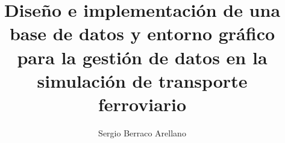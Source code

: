 
\title{Diseño e implementación de una base de datos y entorno gráfico para la gestión
de datos en la simulación de transporte ferroviario}
\author{Sergio Berraco Arellano}










\address{UCLM --- Escuela de Ingeniería Industrial y Aeroespacial\\
    Campus Universitario de la Real Fábrica de Armas}
